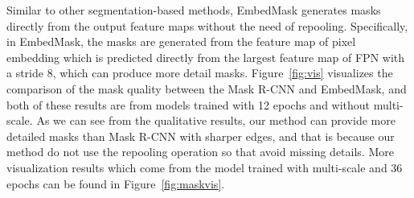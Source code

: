 \documentclass[10pt,twocolumn,letterpaper]{article}
\begin{document}
\medbreak
{}
Similar to other segmentation-based methods, EmbedMask generates masks directly from the output feature maps without the need of repooling. 
Specifically, in EmbedMask, the masks are generated from the feature map of pixel embedding which is predicted directly from the largest feature map of FPN with a stride 8, which can produce more detail masks. 
Figure~\ref{fig:vis} visualizes the comparison of the mask quality between the Mask R-CNN and EmbedMask, and both of these results are from models trained with 12 epochs and without multi-scale. 
As we can see from the qualitative results, our method can provide more detailed masks than Mask R-CNN with sharper edges, and that is because our method do not use the repooling operation so that avoid missing details. 
More visualization results which come from the model trained with multi-scale and 36 epochs can be found in Figure~\ref{fig:maskvis}. 
\end{document}
